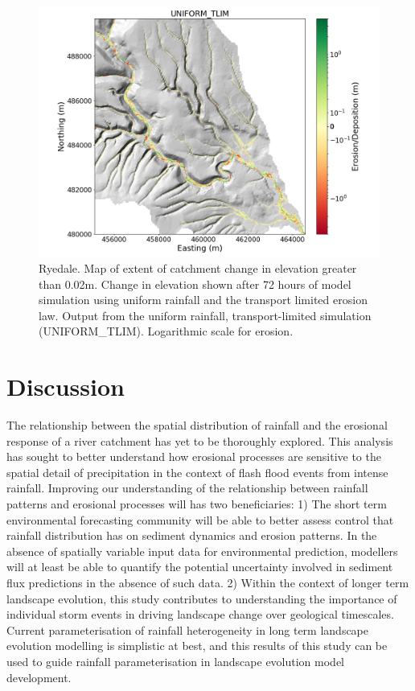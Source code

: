 \begin{figure}[htb]
\includegraphics[width=16cm]{chp06_figures_scripts/fig_ryedale_lower_erodediff_uniform_tlim.png}
\caption{Ryedale. Map of extent of catchment change in elevation greater than 0.02m. Change in elevation shown after 72 hours of model simulation using uniform rainfall and the transport limited erosion law. Output from the uniform rainfall, transport-limited simulation (UNIFORM\_TLIM). Logarithmic scale for erosion.}
\label{fig_ryedale_erodediff_lower_uniform_tlim}
\end{figure}

\section{Discussion}

The relationship between the spatial distribution of rainfall and the erosional response of a river catchment has yet to be thoroughly explored. This analysis has sought to better understand how erosional processes are sensitive to the spatial detail of precipitation in the context of flash flood events from intense rainfall. Improving our understanding of the relationship between rainfall patterns and erosional processes will has two beneficiaries: 1) The short term environmental forecasting community will be able to better assess control that  rainfall distribution has on sediment dynamics and erosion patterns. In the absence of spatially variable input data for environmental prediction, modellers will at least be able to quantify the potential uncertainty involved in sediment flux predictions in the absence of such data. 2) Within the context of longer term landscape evolution, this study contributes to understanding the importance of individual storm events in driving landscape change over geological timescales. Current parameterisation of rainfall heterogeneity in long term landscape evolution modelling is simplistic at best, and this results of this study can be used to guide rainfall parameterisation in landscape evolution model development. 

